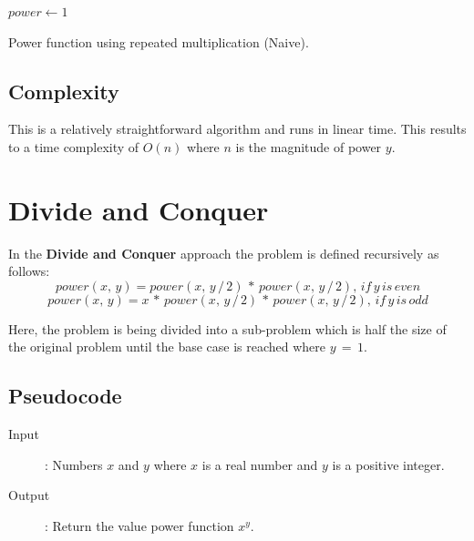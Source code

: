 \documentclass[11pt,a4paper]{report}
\theoremstyle{definition}
\theoremstyle{remark}
\begin{document}
            	\begin{algorithm}
                	    $power \gets 1$\;
                	    \;
                \caption{Power function using repeated multiplication (Naive).}
                \label{alg:power-incremental}
            	\end{algorithm}
            	
            \subsection{Complexity}
            This is a relatively straightforward algorithm and runs in linear time. This results to a time complexity of $O(n)$ where $n$ is the magnitude of power $y$.
        
        \clearpage
        \section{Divide and Conquer}
            In the \textbf{Divide and Conquer} approach the problem is defined recursively as follows:
            $$power(x, \, y) = power(x, \, y \, / \, 2) \, * \, power(x, \, y \, / \, 2), \, if \, y \, is \, even$$
            $$power(x, \, y) = x \, * \, power(x, \, y \, / \, 2) \, * \, power(x, \, y \, / \, 2), \, if \, y \, is \, odd$$
        
            Here, the problem is being divided into a sub-problem which is half the size of the original problem until the base case is reached where $y \, = \, 1.$
        
            \subsection{Pseudocode}
            	\begin{description}
                	\item [Input]: Numbers $x$ and $y$ where $x$ is a real number and $y$ is a positive integer.
                	\item [Output]: Return the value power function $x^y$.
            	\end{description}
            	
\end{document}

